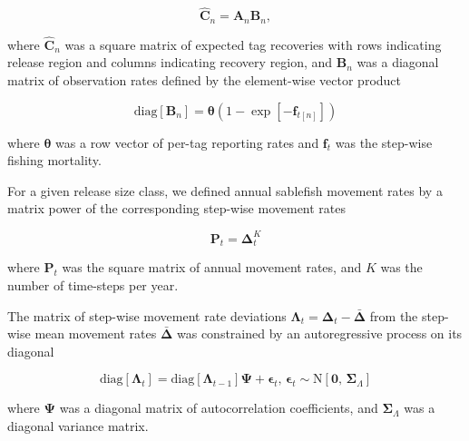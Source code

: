 \documentclass{article}
\begin{document}
\begin{equation}
  \label{eq:expected}
  \boldsymbol{\widehat{C}}_n = \boldsymbol{A}_n \boldsymbol{B}_n,
\end{equation}

\noindent where $\boldsymbol{\widehat{C}}_n$ was a square matrix of expected tag recoveries with rows indicating release region and columns indicating recovery region, and $\boldsymbol{B}_n$ was a diagonal matrix of observation rates defined by the element-wise vector product

\begin{equation}
  \label{eq:observation}
  \mathrm{diag} \! \left[\boldsymbol{B}_{n}\right] =\boldsymbol{\theta} \left(1 - \exp\!{\left[-\boldsymbol{f}_{t[n]} \right]} \right) 
\end{equation}

\noindent where $\boldsymbol{\theta}$ was a row vector of per-tag reporting rates and $\boldsymbol{f}_t$ was the step-wise fishing mortality.

For a given release size class, we defined annual sablefish movement rates by a matrix power of the corresponding step-wise movement rates

\begin{equation}
    \label{eq:movement}
    \boldsymbol{P}_t = \boldsymbol{\Delta}_t^K
\end{equation}

\noindent where $\boldsymbol{P}_t$ was the square matrix of annual movement rates, and $K$ was the number of time-steps per year.

The matrix of step-wise movement rate deviations $\boldsymbol{\Lambda}_t = \boldsymbol{\Delta}_t - \boldsymbol{\bar{\Delta}}$ from the step-wise mean movement rates $\boldsymbol{\bar{\Delta}}$ was constrained by an autoregressive process on its diagonal

\begin{equation}
  \label{eq:timevary}
  \mathrm{diag}\!\left[\boldsymbol{\Lambda}_t\right] = \mathrm{diag}\!\left[\boldsymbol{\Lambda}_{t-1}\right]\! \boldsymbol{\Psi} + \boldsymbol{\epsilon}_t, \, \boldsymbol{\epsilon}_t \sim \mathrm{N}\!\left[\boldsymbol{0},\,\boldsymbol{\Sigma}_\Lambda\right]
\end{equation}

\noindent where $\boldsymbol{\Psi}$ was a diagonal matrix of autocorrelation coefficients, and $\boldsymbol{\Sigma}_\Lambda$ was a diagonal variance matrix.
\end{document}
